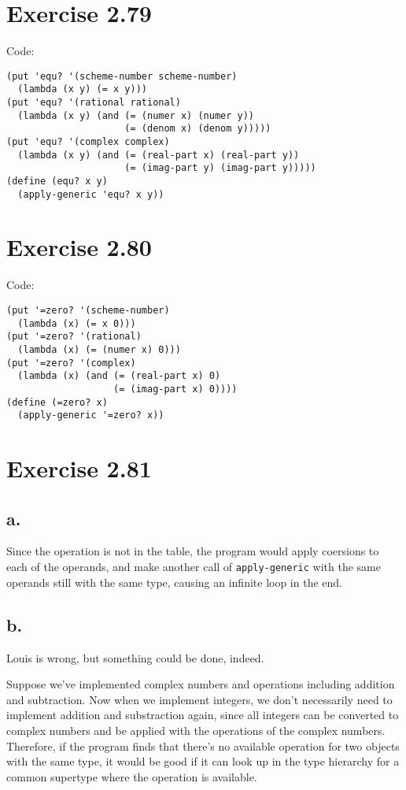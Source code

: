 \documentclass[../main.tex]{subfiles}
\begin{document}
\section{Exercise 2.79}

Code:

\begin{lstlisting}
(put 'equ? '(scheme-number scheme-number)
  (lambda (x y) (= x y)))
(put 'equ? '(rational rational)
  (lambda (x y) (and (= (numer x) (numer y))
                     (= (denom x) (denom y)))))
(put 'equ? '(complex complex)
  (lambda (x y) (and (= (real-part x) (real-part y))
                     (= (imag-part y) (imag-part y)))))
(define (equ? x y)
  (apply-generic 'equ? x y))
\end{lstlisting}

\section{Exercise 2.80}

Code:

\begin{lstlisting}
(put '=zero? '(scheme-number)
  (lambda (x) (= x 0)))
(put '=zero? '(rational)
  (lambda (x) (= (numer x) 0)))
(put '=zero? '(complex)
  (lambda (x) (and (= (real-part x) 0)
                   (= (imag-part x) 0))))
(define (=zero? x)
  (apply-generic '=zero? x))
\end{lstlisting}

\section{Exercise 2.81}

\subsection{a.}

Since the operation is not in the table, the program
 would apply coersions to each of the operands, and make
 another call of \lstinline{apply-generic} with the
 same operands still with the same type, causing an
 infinite loop in the end.

\subsection{b.}

Louis is wrong, but something could be done, indeed.

Suppose we've implemented complex numbers and operations
 including addition and subtraction. Now when we implement
 integers, we don't necessarily need to implement
 addition and substraction again, since all integers can
 be converted to complex numbers and be applied with
 the operations of the complex numbers. Therefore, if
 the program finds that there's no available operation
 for two objects with the same type, it would be good
 if it can look up in the type hierarchy for a common
 supertype where the operation is available.
\end{document}
